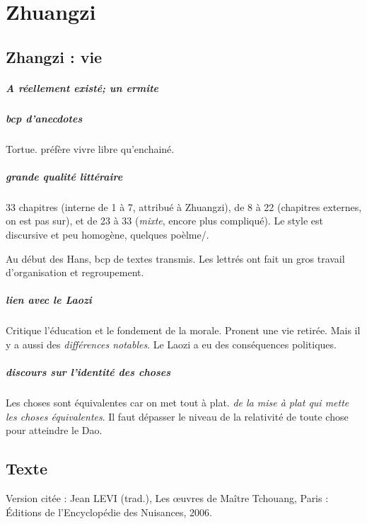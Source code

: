 \chapter{Zhuangzi}

\section{Zhangzi : vie}


\paragraph{A réellement existé; un ermite}

\paragraph{bcp d'anecdotes} Tortue. préfère vivre libre qu'enchainé.

\paragraph{grande qualité littéraire} 33 chapitres (interne de 1 à 7, attribué à Zhuangzi), de 8 à 22 (chapitres externes, on est pas sur), et de 23 à 33 (\textit{mixte}, encore plus compliqué). Le style est discursive et peu homogène, quelques poèlme/.

Au début des Hans, bcp de textes transmis. Les lettrés ont fait un gros travail d'organisation et regroupement.


\paragraph{lien avec le Laozi} Critique l'éducation et le fondement de la morale. Pronent une vie retirée. Mais il y a aussi des \textit{différences notables}. Le Laozi a eu des conséquences politiques. 


\paragraph{discours sur l'identité des choses} Les choses sont équivalentes car on met tout à plat. \textit{de la mise à plat qui mette les choses équivalentes}. Il faut dépasser le niveau de la relativité de toute chose pour atteindre le Dao.




\section{Texte}
  Version citée :  Jean LEVI (trad.), Les œuvres de Maître Tchouang, Paris : Éditions de l'Encyclopédie des Nuisances, 2006.   


